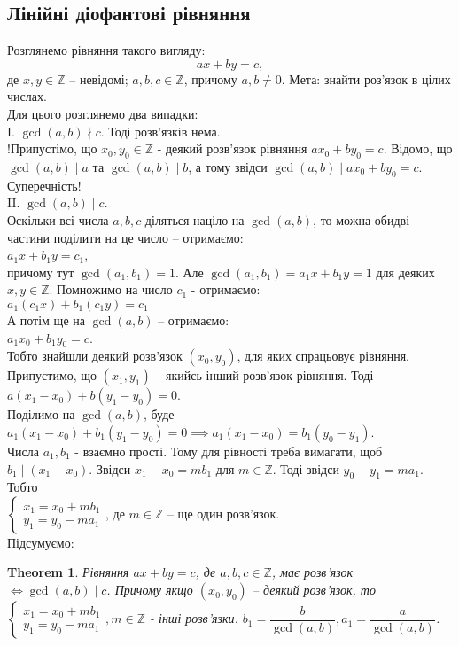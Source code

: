 \documentclass[a4paper, 14pt]{extarticle}
\theoremstyle{theoremdd}
\newtheorem{theorem}{Theorem}[subsection]
\theoremstyle{theoremdd}
\theoremstyle{theoremdd}
\theoremstyle{theoremdd}
\theoremstyle{theoremdd}
\theoremstyle{theoremdd}
\theoremstyle{theoremdd}
\theoremstyle{theoremdd}
\begin{document}
\subsection{Лінійні діофантові рівняння}
Розглянемо рівняння такого вигляду:
$$ax + by = c,$$
де $x,y \in \mathbb{Z}$ -- невідомі; $a,b,c \in \mathbb{Z}$, причому $a,b \neq 0$. Мета: знайти роз'язок в цілих числах.
\bigskip \\
Для цього розглянемо два випадки:\\
I. $\gcd(a,b) \nmid c$. Тоді розв'язків нема.\\
!Припустімо, що $x_0,y_0 \in \mathbb{Z}$ - деякий розв'язок рівняння $ax_0 + by_0 = c$. Відомо, що $\gcd(a,b) \mid a$ та $\gcd(a,b) \mid b$, а тому звідси $\gcd(a,b) \mid ax_0 + by_0 = c$. Суперечність!
\bigskip \\
II. $\gcd(a,b) \mid c$.\\
Оскільки всі числа $a,b,c$ діляться націло на $\gcd(a,b)$, то можна обидві частини поділити на це число -- отримаємо:\\
$a_1x + b_1y = c_1$, \\
причому тут $\gcd(a_1,b_1) = 1$. Але $\gcd(a_1,b_1) = a_1 x + b_1 y = 1$ для деяких $x,y \in \mathbb{Z}$. Помножимо на число $c_1$ - отримаємо:\\
$a_1 (c_1x) + b_1 (c_1y) = c_1$\\
А потім ще на $\gcd (a,b)$ -- отримаємо:\\
$a_1 x_0 + b_1 y_0 = c$.\\
Тобто знайшли деякий розв'язок $(x_0,y_0)$, для яких спрацьовує рівняння.
\bigskip \\
Припустимо, що $(x_1,y_1)$ -- якийсь інший розв'язок рівняння. Тоді \\
$a(x_1-x_0) + b(y_1-y_0) = 0$. \\
Поділимо на $\gcd(a,b)$, буде\\
$a_1 (x_1-x_0) + b_1(y_1-y_0) = 0 \implies a_1(x_1-x_0) = b_1(y_0-y_1)$.\\
Числа $a_1,b_1$ - взаємно прості. Тому для рівності треба вимагати, щоб $b_1 \mid (x_1-x_0)$. Звідси $x_1 - x_0 = mb_1$ для $m \in \mathbb{Z}$. Тоді звідси $y_0 - y_1 = ma_1$. Тобто \\
$\begin{cases} x_1 = x_0 + mb_1 \\ y_1 = y_0 - ma_1 \end{cases}$, де $m \in \mathbb{Z}$ -- ще один розв'язок.\\
Підсумуємо:
\begin{theorem}
Рівняння $ax + by = c$, де $a,b,c \in \mathbb{Z}$, має розв'язок $\iff \gcd(a,b) \mid c$. Причому якщо $(x_0,y_0)$ -- деякий розв'язок, то\\
$\begin{cases} x_1 = x_0 + mb_1 \\ y_1 = y_0 - ma_1 \end{cases}, m \in \mathbb{Z}$ - інші розв'язки. $b_1 = \dfrac{b}{\gcd(a,b)}, a_1 = \dfrac{a}{\gcd(a,b)}$.
\end{theorem}
\end{document}
